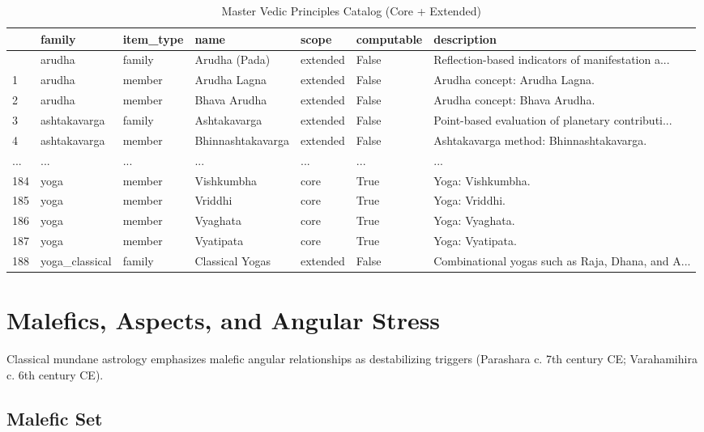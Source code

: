 \documentclass[
  11pt,
  a4paper,
  oneside,
  openany]{report}
\begin{document}
\begin{longtable}[]{@{}lllllll@{}}

\caption{\label{tbl-eq-vedic-master}Master Vedic Principles Catalog
(Core + Extended)}

\tabularnewline

\toprule\noalign{}
& family & item\_type & name & scope & computable & description \\
\midrule\noalign{}
\endhead
\bottomrule\noalign{}
\endlastfoot
0 & arudha & family & Arudha (Pada) & extended & False &
Reflection-based indicators of manifestation a... \\
1 & arudha & member & Arudha Lagna & extended & False & Arudha concept:
Arudha Lagna. \\
2 & arudha & member & Bhava Arudha & extended & False & Arudha concept:
Bhava Arudha. \\
3 & ashtakavarga & family & Ashtakavarga & extended & False &
Point-based evaluation of planetary contributi... \\
4 & ashtakavarga & member & Bhinnashtakavarga & extended & False &
Ashtakavarga method: Bhinnashtakavarga. \\
... & ... & ... & ... & ... & ... & ... \\
184 & yoga & member & Vishkumbha & core & True & Yoga: Vishkumbha. \\
185 & yoga & member & Vriddhi & core & True & Yoga: Vriddhi. \\
186 & yoga & member & Vyaghata & core & True & Yoga: Vyaghata. \\
187 & yoga & member & Vyatipata & core & True & Yoga: Vyatipata. \\
188 & yoga\_classical & family & Classical Yogas & extended & False &
Combinational yogas such as Raja, Dhana, and A... \\

\end{longtable}

\chapter{Malefics, Aspects, and Angular
Stress}\label{malefics-aspects-and-angular-stress}

Classical mundane astrology emphasizes malefic angular relationships as
destabilizing triggers (Parashara c. 7th century CE; Varahamihira c. 6th
century CE).

\section{Malefic Set}\label{malefic-set}
\end{document}
